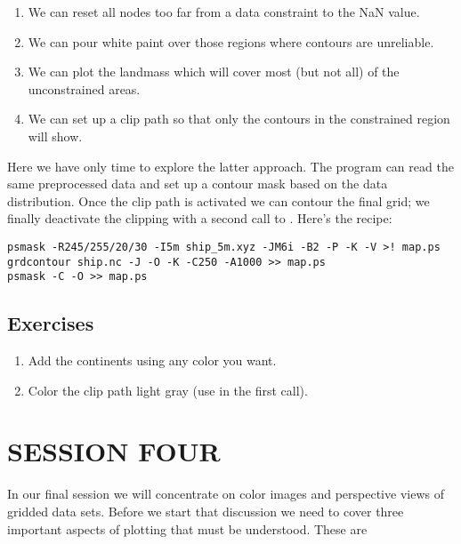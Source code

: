 \documentclass{report}
\begin{document}
\begin{enumerate}

\item We can reset all nodes too far from a data constraint to the
NaN value.

\item We can pour white paint over those regions where contours
are unreliable.

\item We can plot the landmass which will cover most (but not all)
of the unconstrained areas.

\item We can set up a clip path so that only the contours in the
constrained region will show.

\end{enumerate}

Here we have only time to explore the latter approach.  The 
program can read the same preprocessed data and set up a contour mask
based on the data distribution.  Once the clip path is activated we can
contour the final grid; we finally deactivate the clipping with a second
call to .  Here's the recipe:

\begin{verbatim}
psmask -R245/255/20/30 -I5m ship_5m.xyz -JM6i -B2 -P -K -V >! map.ps
grdcontour ship.nc -J -O -K -C250 -A1000 >> map.ps
psmask -C -O >> map.ps
\end{verbatim}

\section{Exercises}

\begin{enumerate}

\item Add the continents using any color you want.

\item Color the clip path light gray (use  in the first
 call).

\end{enumerate}

\chapter{SESSION FOUR}
\thispagestyle{headings}

In our final session we will concentrate on color images and
perspective views of gridded data sets.  Before we start that
discussion we need to cover three important aspects of plotting
that must be understood.  These are
\end{document}
